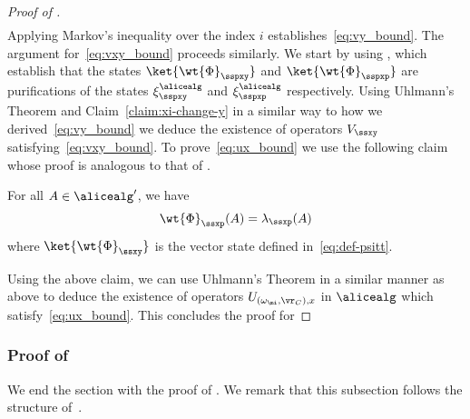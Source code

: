 \begin{proof}[Proof of ]
\begin{align*}
	\end{align*}
	Applying Markov's inequality over the index $i$ establishes~\eqref{eq:vy_bound}. The argument for~\eqref{eq:vxy_bound} proceeds similarly. We start by using , which establish that the states $\ket{\wt{\Phi}_\sspxy}$ and $\ket{\wt{\Phi}_\sspxp}$ are purifications of the states $\xi^{\alicealg}_\sspxy$ and $\xi^{\alicealg}_\sspxp$ respectively. Using Uhlmann's Theorem and Claim~\ref{claim:xi-change-y} in a similar way to how we derived~\eqref{eq:vy_bound} we deduce the existence of operators $V_{\ssxy}$ satisfying~\eqref{eq:vxy_bound}. To prove~\eqref{eq:ux_bound} we use the following claim whose proof is analogous to that of .
	
	\begin{claim}
		\label{clm:lambda-purification}
		For all $A \in \alicealg'$, we have
		\begin{gather*}
			\wt{\Phi}_{\ssxp}(A) = \lambda_\ssxp(A)
		\end{gather*}
		where $\ket{\wt{\Phi}_\ssxy}$ is the vector state defined in~\eqref{eq:def-psitt}. 
	\end{claim}
	
	Using the above claim, we can use Uhlmann's Theorem in a similar manner as above to deduce the existence of operators $U_{(\omega_{\mi}, \vr_C),x}$ in $\alicealg$ which satisfy~\eqref{eq:ux_bound}. This concludes the proof for 
\end{proof}


\subsubsection{Proof of }

We end the section with the proof of . We remark that this subsection follows the structure of~\cite[Section 5.4]{bavarianAnchoredParallelRepetition2021}.

